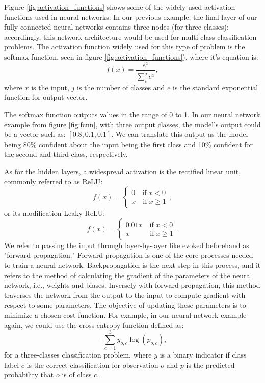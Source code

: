 Figure \ref{fig:activation_functions} shows some of the widely used activation
functions used in neural networks. In our previous example, the final layer of
our fully connected neural networks contains three nodes (for three
classes); accordingly, this network architecture would be used for multi-class
classification problems. The activation function widely used for this type of
problem is the softmax function, seen in figure \ref{fig:activation_functions}),
where it's equation is:
\begin{equation} \label{eq:softmax}
    f(x) = \frac{e^{x}}{\sum^{j}_{i}e^{x}},
\end{equation}
where $x$ is the input, $j$ is the number of classes and $e$ is the standard
exponential function for output vector.


The softmax function outputs values in the range of 0 to 1. In our neural
network example from figure \ref{fig:fcnn}, with three output classes, the
model's output could be a vector such as: $[0.8, 0.1, 0.1]$. We can translate
this output as the model being 80\% confident about the input being the first
class and 10\% confident for the second and third class, respectively.

As for the hidden layers, a widespread activation is the rectified linear unit,
commonly referred to as ReLU:
\begin{equation} \label{eq:relu}
    f(x) =
    \begin{cases}
        0 \quad \textrm{if} \; x < 0 \\
        x \quad \textrm{if} \; x \geq 1
    \end{cases}
    ,
\end{equation}
or its modification Leaky ReLU:
\begin{equation} \label{eq:leaky_relu}
    f(x) =
    \begin{cases}
        0.01x \quad \textrm{if} \; x < 0 \\
        x \quad \quad \; \; \; \textrm{if} \; x \geq 1
    \end{cases}
    .
\end{equation}
We refer to passing the input through layer-by-layer like evoked beforehand as
"forward propagation." Forward propagation is one of the core processes needed
to train a neural network. Backpropagation \cite{rumelhart_learning_1986} is the
next step in this process, and it refers to the method of calculating the
gradient of the parameters of the neural network, i.e., weights and biases.
Inversely with forward propagation, this method traverses the network from the
output to the input to compute gradient with respect to some parameters. The
objective of updating these parameters is to minimize a chosen cost function.
For example, in our neural network example again, we could use the cross-entropy
function defined as:
\begin{equation} \label{eq:cross-entropy}
    -\sum^{3}_{c=1}y_{o,c} \log{(p_{o,c})},
\end{equation}
for a three-classes classification problem, where $y$ is a binary indicator if
class label $c$ is the correct classification for observation $o$ and $p$ is the
predicted probability that $o$ is of class $c$.

